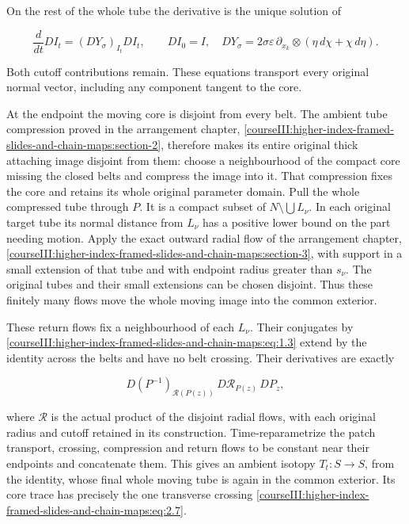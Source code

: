 On the rest of the whole tube the derivative is the unique solution of

\begin{equation}
\frac{d}{dt}D I_t=(D Y_\sigma)_{I_t}D I_t,\qquad D I_0=I,
 \quad
 D Y_\sigma=2\sigma\varepsilon\,\partial_{x_k}
       \otimes(\eta\,d\chi+\chi\,d\eta).
 \label{courseIII:higher-index-framed-slides-and-chain-maps:eq:2.9}
\end{equation}

Both cutoff contributions remain. These equations transport every original normal vector, including any component tangent to the core.

At the endpoint the moving core is disjoint from every belt. The ambient tube compression proved in the arrangement chapter, \cref{courseIII:higher-index-framed-slides-and-chain-maps:section-2}, therefore makes its entire original thick attaching image disjoint from them: choose a neighbourhood of the compact core missing the closed belts and compress the image into it. That compression fixes the core and retains its whole original parameter domain. Pull the whole compressed tube through \(P\). It is a compact subset of \(N\setminus\bigcup L_\nu\). In each original target tube its normal distance from \(L_\nu\) has a positive lower bound on the part needing motion. Apply the exact outward radial flow of the arrangement chapter, \cref{courseIII:higher-index-framed-slides-and-chain-maps:section-3}, with support in a small extension of that tube and with endpoint radius greater than \(s_\nu\). The original tubes and their small extensions can be chosen disjoint. Thus these finitely many flows move the whole moving image into the common exterior.

These return flows fix a neighbourhood of each \(L_\nu\). Their conjugates by \eqref{courseIII:higher-index-framed-slides-and-chain-maps:eq:1.3} extend by the identity across the belts and have no belt crossing. Their derivatives are exactly

\begin{equation}
D(P^{-1})_{\mathcal R(P(z))}
       \,D\mathcal R_{P(z)}\,DP_z,
 \label{courseIII:higher-index-framed-slides-and-chain-maps:eq:2.10}
\end{equation}

where \(\mathcal R\) is the actual product of the disjoint radial flows, with each original radius and cutoff retained in its construction. Time-reparametrize the patch transport, crossing, compression and return flows to be constant near their endpoints and concatenate them. This gives an ambient isotopy \(T_t:S\to S\), from the identity, whose final whole moving tube is again in the common exterior. Its core trace has precisely the one transverse crossing \eqref{courseIII:higher-index-framed-slides-and-chain-maps:eq:2.7}.

